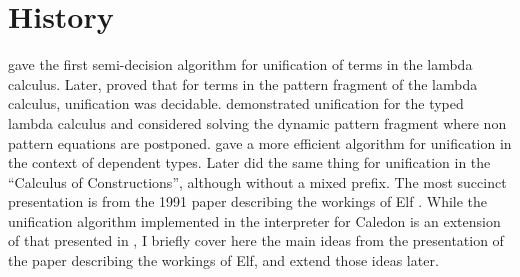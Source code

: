 \section{History}

\citet{Huet75} gave the first semi-decision algorithm for unification of 
terms in the lambda calculus.  
Later, \citet{miller1986higher} proved
that for terms in the pattern fragment of the lambda calculus, unification was decidable.  
\citet{pfenning1988higher} demonstrated unification 
for the typed lambda calculus and considered solving the dynamic pattern fragment where non pattern equations
are postponed.
\citet{elliott1989higher} gave a more efficient algorithm for unification in the context 
of dependent types. Later \citet{pfenning1991unification}
did the same thing for unification in the ``Calculus of Constructions'', although without a mixed prefix.  
The most succinct presentation is from the 1991 paper describing the workings of Elf 
\citep{pfenning1991logic}.  While the unification algorithm implemented in the interpreter for Caledon is 
an extension of that presented in \citet{pfenning1991unification}, 
I briefly cover here the main ideas from the presentation of the paper describing the workings of Elf, 
and extend those ideas later.


